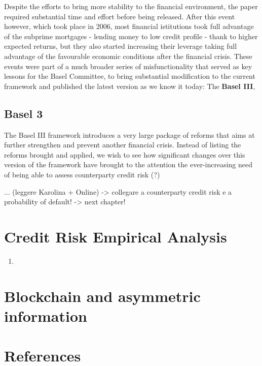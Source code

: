 \documentclass[a4paper,12pt]{article}
\begin{document}
    Despite the efforts to bring more stability to the financial environment, the paper required substantial time and effort before being released. After this event however, which took place in 2006,
    most financial istitutions took full advantage of the subprime mortgages - lending money to low credit profile - thank to higher expected returns, but they also started increasing their leverage
    taking full advantage of the favourable economic conditions after the financial crisis. These events were part of a much broader series of misfunctionality that served as key lessons for the Basel 
    Committee, to bring substantial modification to the current framework and published the latest version as we know it today: The \textbf{Basel III},

    \subsection[]{Basel 3}
    The Basel III framework introduces a very large package of reforms that aims at further strengthen and prevent another financial crisis. Instead of listing the reforms brought and applied, we wish
    to see how significant changes over this version of the framework have brought to the attention the ever-increasing need of being able to assess counterparty credit risk (?)

... (leggere Karolina + Online) -> collegare a counterparty credit risk e a probability of default! -> next chapter!

    \pagebreak
    \section{Credit Risk Empirical Analysis}

    \begin{enumerate}
        \item 
    \end{enumerate}
    
    \pagebreak
    \section{Blockchain and asymmetric information}

    \pagebreak
    \section{References}
\end{document}
